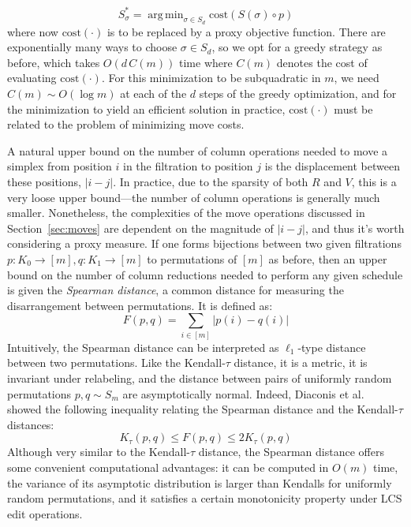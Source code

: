 \documentclass{siamart190516}
\DeclareMathOperator*{\argmin}{arg\,min}
\begin{document}
\begin{equation}\label{eq:schedule_opt2}
	S_\sigma^\ast = \argmin_{\sigma \in S_d} \mathrm{cost}(S(\sigma) \circ p)
\end{equation}
where now $\mathrm{cost}(\cdot)$ is to be replaced by a proxy objective function. There are exponentially many ways to choose $\sigma \in S_d$, so we opt for a greedy strategy as before, which takes $O(d \, C(m))$ time where $C(m)$ denotes the cost of evaluating $\mathrm{cost}(\cdot)$. For this minimization to be subquadratic in $m$, we need $C(m) \sim O(\log m)$ at each of the $d$ steps of the greedy optimization, and for the minimization to yield an efficient solution in practice, $\mathrm{cost}(\cdot)$ must be related to the problem of minimizing move costs.

A natural upper bound on the number of column operations needed to move a simplex from position $i$ in the filtration to position $j$ is the displacement between these positions, $\lvert i - j \rvert$. In practice, due to the sparsity of both $R$ and $V$, this is a very loose upper bound---the number of column operations is generally much smaller. Nonetheless, the complexities of the move operations discussed in Section~\ref{sec:moves} are dependent on the magnitude of $\lvert i - j \rvert$, and thus it's worth considering a proxy measure. If one forms bijections between two given filtrations $p: K_0 \to [m], q: K_1 \to [m]$ to permutations of $[m]$ as before, then an upper bound on the number of column reductions needed to perform any given schedule is given the \emph{Spearman distance}, a common distance for measuring the disarrangement between permutations. It is defined as:
\begin{equation}\label{eq:spearman_dist}
F(p, q) = \sum\limits_{i \in [m]} \lvert p(i) - q(i) \rvert
\end{equation}
Intuitively, the Spearman distance can be interpreted as $\ell_1$-type distance between two permutations. Like the Kendall-$\tau$ distance, it is a metric, it is invariant under relabeling, and the distance between pairs of uniformly random permutations $p, q \sim S_m$ are asymptotically normal. 
Indeed, Diaconis et al.~\cite{diaconis1977spearman} showed the following inequality relating the Spearman distance and the Kendall-$\tau$ distances:
\begin{equation}\label{eq:diaconis_inequality}
K_\tau(p, q) \leq F(p, q) \leq 2 K_\tau(p, q)
\end{equation}
Although very similar to the Kendall-$\tau$ distance, the Spearman distance offers some convenient computational advantages: it can be computed in $O(m)$ time, the variance of its asymptotic distribution is larger than Kendalls for uniformly random permutations, and it satisfies a certain monotonicity property under LCS edit operations. 
\end{document}
